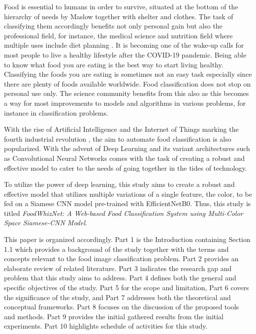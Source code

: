 Food is essential to humans in order to survive, situated at the bottom of the hierarchy of needs by Maslow \cite{Mcleod2023} together with shelter and clothes. The task of classifying them accordingly benefits not only personal gain but also the professional field, for instance, the medical science and nutrition field where multiple uses include diet planning \cite{chun-2022, de-kervenoael-2023,zhou-2019}. It is becoming one of the wake-up calls for most people to live a healthy lifestyle after the COVID-19 pandemic. Being able to know what food you are eating is the best way to start living healthy. Classifying the foods you are eating is sometimes not an easy task especially since there are plenty of foods available worldwide. Food classification does not stop on personal use only. The science community benefits from this also as this becomes a way for most improvements to models and algorithms in various problems, for instance in classification problems.

With the rise of Artificial Intelligence and the Internet of Things marking the fourth industrial revolution \cite{sarker-2021}, the aim to automate food classification is also popularized. With the advent of Deep Learning and its variant architectures such as Convolutional Neural Networks \cite{lecun-2015,shrestha-2019} comes with the task of creating a robust and effective model to cater to the needs of going together in the tides of technology.

To utilize the power of deep learning, this study aims to create a robust and effective model that utilizes multiple variations of a single feature, the color, to be fed on a Siamese CNN model pre-trained with EfficientNetB0. Thus, this study is titled \textit{FoodWhizNet: A Web-based Food Classification System using Multi-Color Space Siamese-CNN Model}.

This paper is organized accordingly. Part 1 is the Introduction containing Section 1.1 which provides a background of the study together with the terms and concepts relevant to the food image classification problem. Part 2 provides an elaborate review of related literature. Part 3 indicates the research gap and problem that this study aims to address. Part 4 defines both the general and specific objectives of the study. Part 5 for the scope and limitation, Part 6 covers the significance of the study, and Part 7 addresses both the theoretical and conceptual frameworks. Part 8 focuses on the discussion of the proposed tools and methods. Part 9 provides the initial gathered results from the initial experiments. Part 10 highlights schedule of activities for this study.  
